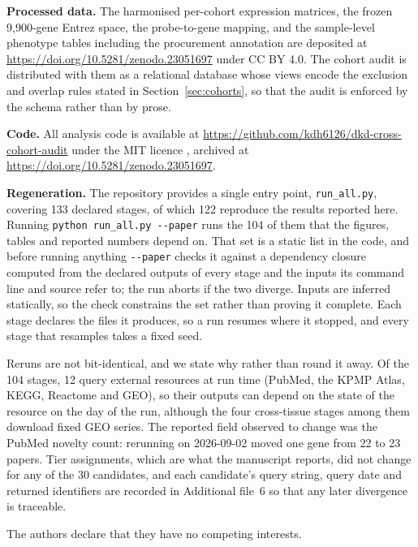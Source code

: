 \documentclass[pdflatex,sn-vancouver-num]{sn-jnl}
\theoremstyle{thmstyleone}
\theoremstyle{thmstyletwo}
\theoremstyle{thmstylethree}
\begin{document}
\textbf{Processed data.} The harmonised per-cohort expression matrices, the frozen 9,900-gene
Entrez space, the probe-to-gene mapping, and the sample-level phenotype tables including the
procurement annotation are deposited at \url{https://doi.org/10.5281/zenodo.23051697} under CC BY 4.0. The cohort audit is
distributed with them as a relational database whose views encode the exclusion and overlap
rules stated in Section~\ref{sec:cohorts}, so that the audit is enforced by the schema rather
than by prose.

\textbf{Code.} All analysis code is available at \url{https://github.com/kdh6126/dkd-cross-cohort-audit} under the MIT licence \cite{kim2026zenodo}, archived at \url{https://doi.org/10.5281/zenodo.23051697}.

\textbf{Regeneration.} The repository provides a single entry point, \texttt{run\_all.py},
covering 133 declared stages, of which 122 reproduce the results reported here. Running
\texttt{python run\_all.py -{}-paper} runs the 104 of them that the figures, tables and
reported numbers depend on. That set is a static list in the code, and before running anything
\texttt{-{}-paper} checks it against a dependency closure computed from the declared outputs of
every stage and the inputs its command line and source refer to; the run aborts if the two
diverge. Inputs are inferred statically, so the check constrains the set rather than proving it
complete.
Each stage declares the files it produces, so a run resumes where it stopped, and every stage
that resamples takes a fixed seed.

Reruns are not bit-identical, and we state why rather than round it away. Of the 104 stages,
12 query external resources at run time (PubMed, the KPMP Atlas, KEGG, Reactome and GEO),
so their outputs can depend on the state of the resource on the day of the run, although the
four cross-tissue stages among them download fixed GEO series. The reported
field observed to change was the PubMed novelty count: rerunning on 2026-09-02 moved one
gene from 22 to 23 papers. Tier assignments, which are what the manuscript reports, did not
change for any of the 30 candidates, and each candidate's query string, query date and returned
identifiers are recorded in Additional file~6 so that any later divergence is traceable.


The authors declare that they have no competing interests.

\end{document}

